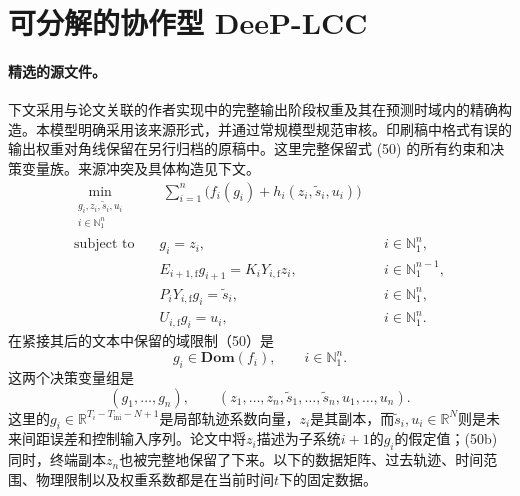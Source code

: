 \documentclass{article}
\begin{document}
\section*{可分解的协作型 DeeP-LCC}
\paragraph{精选的源文件。}
下文采用与论文关联的作者实现中的完整输出阶段权重及其在预测时域内的精确构造。本模型明确采用该来源形式，并通过常规模型规范审核。印刷稿中格式有误的输出权重对角线保留在另行归档的原稿中。这里完整保留式 (50) 的所有约束和决策变量族。来源冲突及具体构造见下文。
\begin{align}
\min_{\substack{g_i,z_i,\tilde{s}_i,u_i\\i\in\mathbb N_1^n}}
&\ \sum_{i=1}^{n}\bigl(f_i(g_i)+h_i(z_i,\tilde{s}_i,u_i)\bigr) \tag{50a}\\
\text{subject to}\quad
&g_i=z_i, &&i\in\mathbb N_1^n, \tag{50b}\\
&E_{i+1,\mathrm f}g_{i+1}=K_iY_{i,\mathrm f}z_i,
&&i\in\mathbb N_1^{n-1}, \tag{50c}\\
&P_iY_{i,\mathrm f}g_i=\tilde{s}_i,
&&i\in\mathbb N_1^n, \tag{50d}\\
&U_{i,\mathrm f}g_i=u_i,
&&i\in\mathbb N_1^n. \tag{50e}
\end{align}
在紧接其后的文本中保留的域限制（50）是
\[
g_i\in\mathbf{Dom}(f_i),\qquad i\in\mathbb N_1^n.
\]
这两个决策变量组是
\[
(g_1,\ldots,g_n),\qquad
(z_1,\ldots,z_n,\tilde{s}_1,\ldots,\tilde{s}_n,u_1,\ldots,u_n).
\]
这里的$g_i\in\mathbb R^{T_i-T_{\mathrm{ini}}-N+1}$是局部轨迹系数向量，$z_i$是其副本，而$\tilde{s}_i,u_i\in\mathbb R^N$则是未来间距误差和控制输入序列。论文中将$z_i$描述为子系统$i+1$的$g_i$的假定值；(50b) 同时，终端副本$z_n$也被完整地保留了下来。以下的数据矩阵、过去轨迹、时间范围、物理限制以及权重系数都是在当前时间$t$下的固定数据。
\end{document}
